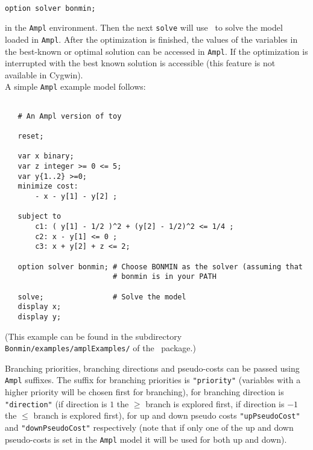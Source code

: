 \begin{colorverb}
\begin{verbatim}

option solver bonmin;

\end{verbatim}
\end{colorverb}

in the {\tt Ampl} environment. Then the next {\tt solve} will
use \Bonmin\ to solve the model loaded in {\tt Ampl}.
After the optimization is finished, the values of the variables in the best-known
or optimal solution can be accessed in {\tt Ampl}. If the optimization is interrupted
with {\tt <CTRL-C>} the best known solution is accessible (this feature is not available in Cygwin).\\

A simple {\tt Ampl} example model follows:

\begin{colorverb}
\begin{verbatim}

   # An Ampl version of toy

   reset;

   var x binary;
   var z integer >= 0 <= 5;
   var y{1..2} >=0;
   minimize cost:
       - x - y[1] - y[2] ;

   subject to
       c1: ( y[1] - 1/2 )^2 + (y[2] - 1/2)^2 <= 1/4 ;
       c2: x - y[1] <= 0 ;
       c3: x + y[2] + z <= 2;

   option solver bonmin; # Choose BONMIN as the solver (assuming that
                         # bonmin is in your PATH

   solve;                # Solve the model
   display x;
   display y;

\end{verbatim}
\end{colorverb}

(This example can be found in the subdirectory {\tt Bonmin/examples/amplExamples/} of
the \Bonmin\ package.)

Branching priorities, branching directions and pseudo-costs can be passed using {\tt Ampl} suffixes.
The suffix for branching priorities is {\tt "priority"} (variables with a higher priority
will be chosen first for branching),
for branching direction is {\tt "direction"} (if direction is $1$ the $\geq$ branch
is explored first, if direction is $-1$ the $\leq$ branch is explored first), for up
and down pseudo costs {\tt "upPseudoCost"} and {\tt "downPseudoCost"} respectively
(note that if only one of the up and down pseudo-costs is set in the {\tt Ampl} model it will
be used for both up and down).\\

